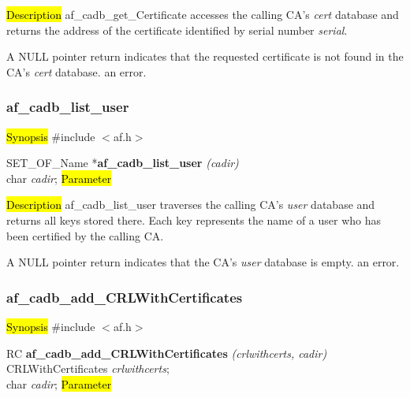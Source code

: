 
\hl{Description}
af\_cadb\_get\_Certificate accesses the calling CA's {\em cert} database and returns the address of 
the certificate identified by serial number {\em serial}. 

A NULL pointer return indicates
\bi
\m that the requested certificate is not found in the CA's {\em cert} database.
\m an error.
\ei



\subsubsection{af\_cadb\_list\_user}
\label{af_cadb_list_user}
\hl{Synopsis}
\#include $<$af.h$>$

SET\_OF\_Name *{\bf af\_cadb\_list\_user} {\em (cadir)} \\
char {\em *cadir};
\hl{Parameter}

\hl{Description}
af\_cadb\_list\_user traverses the calling CA's {\em user} database and returns all keys
stored there. Each key represents the name of a user who has been certified by the
calling CA.

A NULL pointer return indicates
\bi
\m that the CA's {\em user} database is empty.
\m an error.
\ei




\subsubsection{af\_cadb\_add\_CRLWithCertificates}
\label{af_cadb_add_CRLWithCertificates}
\hl{Synopsis}
\#include $<$af.h$>$

RC {\bf af\_cadb\_add\_CRLWithCertificates} {\em (crlwithcerts, cadir)} \\
CRLWithCertificates	{\em *crlwithcerts}; \\
char		{\em *cadir};
\hl{Parameter}


